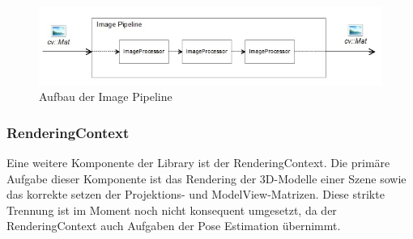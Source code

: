 \documentclass[main.tex]{subfiles}
\begin{document}
\begin{figure}[!ht]
\centering
\includegraphics[scale=0.8]{images/image-pipeline.jpg} 
\caption{Aufbau der Image Pipeline}
\label{fig:image-pipeline}
\end{figure}

\subsubsection{RenderingContext}
Eine weitere Komponente der Library ist der RenderingContext. Die primäre Aufgabe dieser Komponente ist das Rendering der 3D-Modelle einer Szene sowie das korrekte setzen der Projektions- und ModelView-Matrizen. Diese strikte Trennung ist im Moment noch nicht konsequent umgesetzt, da der RenderingContext auch Aufgaben der Pose Estimation übernimmt.  
\end{document}
